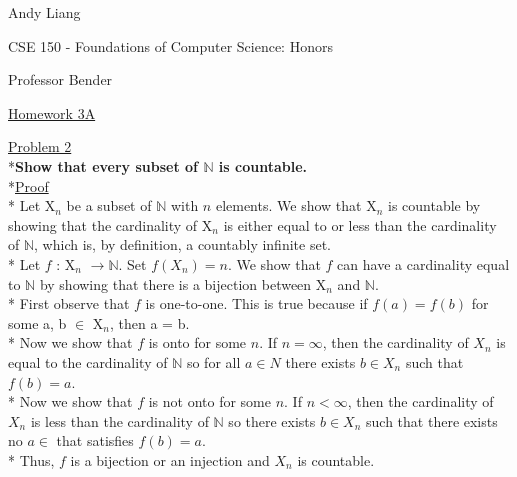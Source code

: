 \documentclass[12pt]{article}
\begin{document}
\begin{flushleft}
Andy Liang

CSE 150 - Foundations of Computer Science: Honors

Professor Bender
\end{flushleft}
\medskip
\centerline{\uline{Homework 3A}}
\bigskip\bigskip



\noindent
\uline{Problem 2}
\\*\textbf{Show that every subset of $\mathbb{N}$ is countable.}
\bigskip
\\*\uline{Proof}
\bigskip
\\* Let X$_n$ be a subset of $\mathbb{N}$ with $n$ elements. We show that X$_n$ is countable by showing that the cardinality of X$_n$ is either equal to or less than the cardinality of $\mathbb{N}$, which is, by definition, a countably infinite set.
\bigskip
\\* Let $f$ : X$_n$ $\rightarrow \mathbb{N}$.  Set $f(X_n) = n$. We show that $f$ can have a cardinality equal to $\mathbb{N}$ by showing that there is a bijection between X$_n$ and $\mathbb{N}$.
\bigskip
\\* First observe that $f$ is one-to-one. This is true because if $f(a) = f(b)$ for some a, b $\in$ X$_n$, then a = b.
\bigskip
\\* Now we show that $f$ is onto for some $n$. If $n = \infty$, then the cardinality of $X_n$ is equal to the cardinality of $\mathbb{N}$ so for all $a \in {N}$ there exists $b \in X_n$ such that $f(b) = a$.
\bigskip
\\* Now we show that $f$ is not onto for some $n$. If $n < \infty$, then the cardinality of $X_n$ is less than the cardinality of $\mathbb{N}$ so there exists $b \in {X_n}$ such that there exists no $a \in $ that satisfies $f(b) = a$. 
\bigskip
\\* Thus, $f$ is a bijection or an injection and $X_n$ is countable. 
\bigskip
\end{document}
